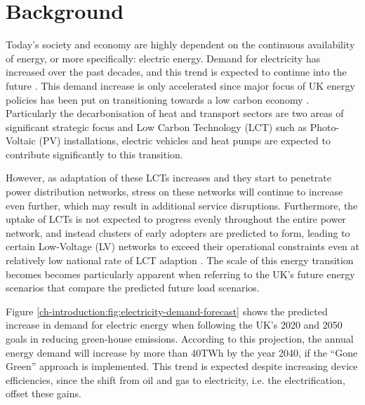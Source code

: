 \section{Background}
\label{ch-introduction:sec:background}


Today's society and economy are highly dependent on the continuous availability of energy, or more specifically: electric energy.
Demand for electricity has increased over the past decades, and this trend is expected to continue into the future \cite{HMGovernment2009}.
This demand increase is only accelerated since major focus of UK energy policies has been put on transitioning towards a low carbon economy \cite{RoyalAcademyofEngineering2010}.
Particularly the decarbonisation of heat and transport sectors are two areas of significant strategic focus and Low Carbon Technology (LCT) such as Photo-Voltaic (PV) installations, electric vehicles and heat pumps are expected to contribute significantly to this transition.

However, as adaptation of these LCTs increases and they start to penetrate power distribution networks, stress on these networks will continue to increase even further, which may result in additional service disruptions.
Furthermore, the uptake of LCTs is not expected to progress evenly throughout the entire power network, and instead clusters of early adopters are predicted to form, leading to certain Low-Voltage (LV) networks to exceed their operational constraints even at relatively low national rate of LCT adaption \cite{Poghosyan2014}.
The scale of this energy transition becomes becomes particularly apparent when referring to the UK's future energy scenarios that compare the predicted future load scenarios.



Figure \ref{ch-introduction:fig:electricity-demand-forecast} shows the predicted increase in demand for electric energy when following the UK's 2020 and 2050 goals in reducing green-house emissions.
According to this projection, the annual energy demand will increase by more than 40TWh by the year 2040, if the ``Gone Green'' approach is implemented.
This trend is expected despite increasing device efficiencies, since the shift from oil and gas to electricity, i.e. the electrification, offset these gains.




